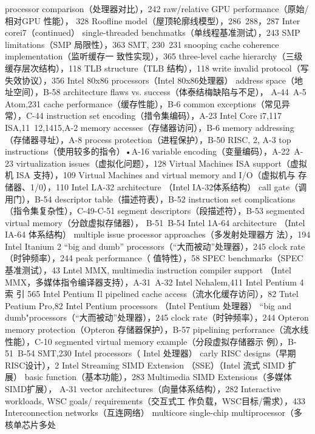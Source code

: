 processor comparison（处理器对比），242
raw/relative GPU performance（原始/相对GPU 性能），
328
Roofline model（屋顶轮廓线模型），286~288，287
Inter corei7（continued）
single-threaded benchmatks（单线程基准测试），243
SMP limitations（SMP 局限性），363
SMT, 230~231
snooping cache coherence implementation（监听缓存一
致性实现），365
three-level cache hierarchy（三级缓存层次结构），118
TLB structure（TLB 结构），118
write invalid protocol（写失效协议），356
Intel 80x86 processors（Intel 80x86处理器）
address space（地址空间），B-58
architecture flaws vs. success（体泰结梅缺陷与不足），
A-44~A-5
Atom,231
cache performance（缓存性能），B-6
common exceptions（常见异常），C-44
instruction set encoding（措令集编码），A-23
Intel Core i7,117
ISA,11~12,1415,A-2
memory accesses（存储器访问），B-6
memory addressing（存储器寻址），A-8
process protection（进程保护），B-50
RISC, 2, A-3
top instructions（使用较多的指令）•A-16
variable encoding（变量编码），A-22~A-23
virtualization issues（虚拟化问题），128
Virtual Machines ISA support（虚拟机 ISA 支持），109
Virtual Machines and virtual memory and I/O（虚拟机与
存储器、1/0），110
Intel LA-32 architecture （Intel IA-32体系结构）
call gate（调用门），B-54
descriptor table（描述符表），B-52
instruction set complications（指令集复杂性），C-49-C-51
segment descriptors（段描述符），B-53
segmented virtual memory（分啟虚拟存储器），
B-51~B-54
Intel 1A-64 architecture （Intel IA-64 体系结构）
multiple issue processor approaches（多发射处理器方
法），194
Intel Itanium 2
“big and dumb” processors（“大而被动”处理器），245
clock rate（时钟频率），244
peak performance（ 值特性），58
SPEC benchmarks（SPEC基准测试），43
Lntel MMX, multimedia instruction compiler support
（Intel MMX，多媒体指令编译器支持），A-31~A-32
Intel Nehalem,411
Intel Pentium 4
索
引
565
Intel Pentium Il
pipelined cache access（流水化缓存访问），82
Tntel Peatium Pro,82
Intel Pentium processors （Intel Pentium 处理器）
“big and dumb"processors（“大而被动”处理器），245
clock rate（时钟频率），244
Opteron memory protection（Opteron 存储器保护），B-57
pipelining perforrance（流水线性能），C-10
segmented virtual memory example（分段虚拟存储器示
例），B-51~B-54
SMT,230
Intel processors（ Intel 处理器）
carly RISC designs（早期RISC设计），2
Intel Streaming SIMD Extension （SSE）（Intel 流式 SIMD
扩展）
basic function（基本功能），283
Multimedia SIMD Extensions（多媒体SIMD扩展），
A-31
vector architectures（向量体系结构），282
Interactive workloads, WSC goals/ requirements（交互式工
作负载，WSC目标/需求），433
Interconnection networks（互连网络）
multicore single-chip multiprocessor（多核单芯片多处
